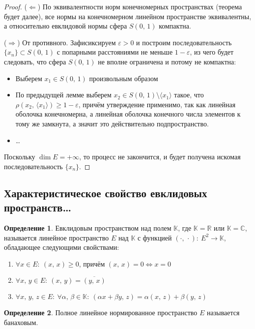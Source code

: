 \documentclass[a4paper,12pt]{article}
\renewcommand{\geq}{\ensuremath{\geqslant}}
\theoremstyle{plain}
\theoremstyle{definition}
\newtheorem{definition}{Определение}[section]
\theoremstyle{remark}
\begin{document}
\begin{proof}
	($\Leftarrow$) По эквивалентности норм конечномерных пространствах (теорема будет далее), все нормы на конечномерном линейном пространстве эквивалентны, а относительно евклидовой нормы сфера $S(0,\,1)$ компактна.

	($\Rightarrow$) От противного. Зафисиксируем $\varepsilon > 0$ и построим последовательность $\{x_n\} \subset S(0,\,1)$ с попарными расстояниями не меньше $1 - \varepsilon$, из чего будет следовать, что сфера $S(0,\,1)$ не вполне ограничена и потому не компактна:
	\begin{itemize}
		\item Выберем $x_1 \in S(0,\,1)$ произвольным образом
		\item По предыдущей лемме выберем $x_2 \in S(0,\,1) \setminus \langle x_1\rangle$ такое, что $\rho(x_2,\, \langle x_1\rangle) \geq 1 - \varepsilon$, причём утверждение применимо, так как линейная оболочка конечномерна, а линейная оболочка конечного числа элементов к тому же замкнута, а значит это действительно подпространство.
		\item \dots
	\end{itemize}
	Поскольку $\dim E = +\infty$, то процесс не закончится, и будет получена искомая последовательность $\{x_n\}$.
\end{proof}

\subsection{Характеристическое свойство евклидовых пространств\dots}
\begin{definition}
	Евклидовым пространством над полем $\mathbb{K}$, где $\mathbb{K} = \mathbb{R}$ или $\mathbb{K} = \mathbb{C}$, называется линейное пространство $E$ над $\mathbb{K}$ с функцией $(\cdot,\, \cdot) :\: E^2 \to \mathbb{K}$, обладающее следующими свойствами:
	\begin{enumerate}
		\item $\forall x \in E :\: (x,\, x) \geq 0$, причём $(x,\, x) = 0 \Leftrightarrow x = 0$
		\item $\forall x,\,y \in E :\: (x,\,y) = \overline{(y,\, x)}$
		\item $\forall x,\,y,\, z \in E :\: \forall \alpha,\, \beta \in \mathbb{K} :\: (\alpha x + \beta y,\, z) = \alpha(x,\,z) + \beta(y,\,z)$
	\end{enumerate}
\end{definition}

\begin{definition}
	Полное линейное нормированное пространство $E$ называется банаховым.
\end{definition}
\end{document}
